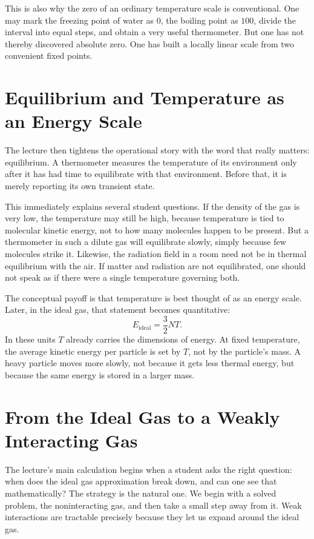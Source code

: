 This is also why the zero of an ordinary temperature scale is conventional. One may mark the freezing point of water as \(0\), the boiling point as \(100\), divide the interval into equal steps, and obtain a very useful thermometer. But one has not thereby discovered absolute zero. One has built a locally linear scale from two convenient fixed points.

\section{Equilibrium and Temperature as an Energy Scale}

The lecture then tightens the operational story with the word that really matters: equilibrium. A thermometer measures the temperature of its environment only after it has had time to equilibrate with that environment. Before that, it is merely reporting its own transient state.

This immediately explains several student questions. If the density of the gas is very low, the temperature may still be high, because temperature is tied to molecular kinetic energy, not to how many molecules happen to be present. But a thermometer in such a dilute gas will equilibrate slowly, simply because few molecules strike it. Likewise, the radiation field in a room need not be in thermal equilibrium with the air. If matter and radiation are not equilibrated, one should not speak as if there were a single temperature governing both.

The conceptual payoff is that temperature is best thought of as an energy scale. Later, in the ideal gas, that statement becomes quantitative:
\begin{equation}
E_{\mathrm{ideal}}=\frac{3}{2}NT.
\end{equation}
In these units \(T\) already carries the dimensions of energy. At fixed temperature, the average kinetic energy per particle is set by \(T\), not by the particle's mass. A heavy particle moves more slowly, not because it gets less thermal energy, but because the same energy is stored in a larger mass.

\section{From the Ideal Gas to a Weakly Interacting Gas}

The lecture's main calculation begins when a student asks the right question: when does the ideal gas approximation break down, and can one see that mathematically? The strategy is the natural one. We begin with a solved problem, the noninteracting gas, and then take a small step away from it. Weak interactions are tractable precisely because they let us expand around the ideal gas.

